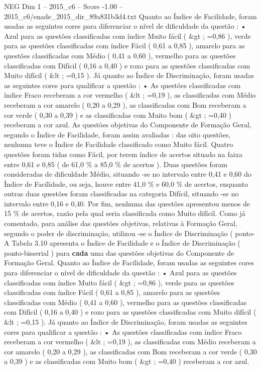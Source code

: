 \begin{textsample}{NEG Dim 1 – 2015\_c6 – Score -1.00 – 2015\_c6/enade\_2015\_dir\_89a831b3d4.txt}
Quanto ao Índice de Facilidade, foram usadas as seguintes cores para diferenciar o nível de dificuldade da questão : • Azul para as questões classificadas com índice Muito fácil ( \&gt ; =0,86 ), verde para as questões classificadas com índice Fácil ( 0,61 a 0,85 ), amarelo para as questões classificadas com Médio ( 0,41 a 0,60 ), vermelho para as questões classificadas com Difícil ( 0,16 a 0,40 ) e roxo para as questões classificadas com Muito difícil ( \&lt ; =0,15 ).
Já quanto ao Índice de Discriminação, foram usadas as seguintes cores para qualificar a questão : • As questões classificadas com índice Fraco receberam a cor vermelho ( \&lt ; =0,19 ), as classificadas com Médio receberam a cor amarelo ( 0,20 a 0,29 ), as classificadas com Bom receberam a cor verde ( 0,30 a 0,39 ) e as classificadas com Muito bom ( \&gt ; =0,40 ) receberam a cor azul.
As questões objetivas do Componente de Formação Geral, segundo o Índice de Facilidade, foram assim avaliadas : das oito questões, nenhuma teve o Índice de Facilidade classificado como Muito fácil.
Quatro questões foram tidas como Fácil, por terem índice de acertos situado na faixa entre 0,61 e 0,85 ( de 61,0 \% a 85,0 \% de acertos ).
Duas questões foram consideradas de dificuldade Médio, situando -se no intervalo entre 0,41 e 0,60 do Índice de Facilidade, ou seja, houve entre 41,0 \% e 60,0 \% de acertos, enquanto outras duas questões foram classificadas na categoria Difícil, situando -se no intervalo entre 0,16 e 0,40.
Por fim, nenhuma das questões apresentou menos de 15 \% de acertos, razão pela qual seria classificada como Muito difícil.
Como já comentado, para análise das questões objetivas, relativas à Formação Geral, segundo o poder de discriminação, utilizou -se o Índice de Discriminação ( ponto- A Tabela 3.10 apresenta o Índice de Facilidade e o Índice de Discriminação ( ponto-bisserial ) para \textbf{cada} uma das questões objetivas do Componente de Formação Geral.
Quanto ao Índice de Facilidade, foram usadas as seguintes cores para diferenciar o nível de dificuldade da questão : • Azul para as questões classificadas com índice Muito fácil ( \&gt ; =0,86 ), verde para as questões classificadas com índice Fácil ( 0,61 a 0,85 ), amarelo para as questões classificadas com Médio ( 0,41 a 0,60 ), vermelho para as questões classificadas com Difícil ( 0,16 a 0,40 ) e roxo para as questões classificadas com Muito difícil ( \&lt ; =0,15 ).
Já quanto ao Índice de Discriminação, foram usadas as seguintes cores para qualificar a questão : • As questões classificadas com índice Fraco receberam a cor vermelho ( \&lt ; =0,19 ), as classificadas com Médio receberam a cor amarelo ( 0,20 a 0,29 ), as classificadas com Bom receberam a cor verde ( 0,30 a 0,39 ) e as classificadas com Muito bom ( \&gt ; =0,40 ) receberam a cor azul.

\end{textsample}
